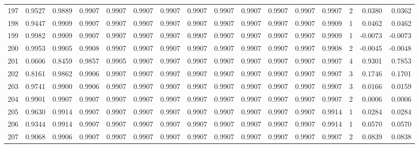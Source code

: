 \begin{tabular}{lrrrrrrrrrrrrrrr}
197 &      0.9527 &  0.9889 &  0.9907 &  0.9907 &  0.9907 &  0.9907 &  0.9907 &  0.9907 &  0.9907 &  0.9907 &   0.9907 &     0.9907 &      2 &                    0.0380 &                     0.0362 \\
198 &      0.9447 &  0.9909 &  0.9907 &  0.9907 &  0.9907 &  0.9907 &  0.9907 &  0.9907 &  0.9907 &  0.9907 &   0.9907 &     0.9909 &      1 &                    0.0462 &                     0.0462 \\
199 &      0.9982 &  0.9909 &  0.9907 &  0.9907 &  0.9907 &  0.9907 &  0.9907 &  0.9907 &  0.9907 &  0.9907 &   0.9907 &     0.9909 &      1 &                   -0.0073 &                    -0.0073 \\
200 &      0.9953 &  0.9905 &  0.9908 &  0.9907 &  0.9907 &  0.9907 &  0.9907 &  0.9907 &  0.9907 &  0.9907 &   0.9907 &     0.9908 &      2 &                   -0.0045 &                    -0.0048 \\
201 &      0.0606 &  0.8459 &  0.9857 &  0.9905 &  0.9907 &  0.9907 &  0.9907 &  0.9907 &  0.9907 &  0.9907 &   0.9907 &     0.9907 &      4 &                    0.9301 &                     0.7853 \\
202 &      0.8161 &  0.9862 &  0.9906 &  0.9907 &  0.9907 &  0.9907 &  0.9907 &  0.9907 &  0.9907 &  0.9907 &   0.9907 &     0.9907 &      3 &                    0.1746 &                     0.1701 \\
203 &      0.9741 &  0.9900 &  0.9906 &  0.9907 &  0.9907 &  0.9907 &  0.9907 &  0.9907 &  0.9907 &  0.9907 &   0.9907 &     0.9907 &      3 &                    0.0166 &                     0.0159 \\
204 &      0.9901 &  0.9907 &  0.9907 &  0.9907 &  0.9907 &  0.9907 &  0.9907 &  0.9907 &  0.9907 &  0.9907 &   0.9907 &     0.9907 &      2 &                    0.0006 &                     0.0006 \\
205 &      0.9630 &  0.9914 &  0.9907 &  0.9907 &  0.9907 &  0.9907 &  0.9907 &  0.9907 &  0.9907 &  0.9907 &   0.9907 &     0.9914 &      1 &                    0.0284 &                     0.0284 \\
206 &      0.9344 &  0.9914 &  0.9907 &  0.9907 &  0.9907 &  0.9907 &  0.9907 &  0.9907 &  0.9907 &  0.9907 &   0.9907 &     0.9914 &      1 &                    0.0570 &                     0.0570 \\
207 &      0.9068 &  0.9906 &  0.9907 &  0.9907 &  0.9907 &  0.9907 &  0.9907 &  0.9907 &  0.9907 &  0.9907 &   0.9907 &     0.9907 &      2 &                    0.0839 &                     0.0838 \\

\end{tabular}
